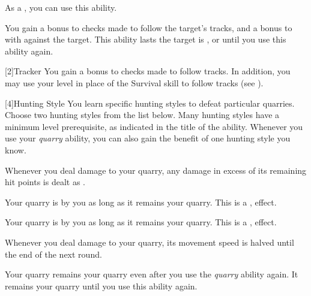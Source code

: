             As a , you can use this ability.
            \begin{ability}
                \begin{spelltargetinginfo}
                \end{spelltargetinginfo}
                \begin{spelleffects}
                    \spelleffect You gain a  bonus to checks made to follow the target's tracks, and a  bonus to  with  against the target.
                    This ability lasts the target is , or until you use this ability again.
                \end{spelleffects}
            \end{ability}

            [2]{Tracker}
            You gain a  bonus to checks made to follow tracks.
            In addition, you may use your level in place of the Survival skill to follow tracks (see ).

            [4]{Hunting Style}
            You learn specific hunting styles to defeat particular quarries.
            Choose two hunting styles from the list below.
            Many hunting styles have a minimum level prerequisite, as indicated in the title of the ability.
            Whenever you use your \textit{quarry} ability, you can also gain the benefit of one hunting style you know.

            Whenever you deal damage to your quarry, any damage in excess of its remaining hit points is dealt as .

            Your quarry is \shaken by you as long as it remains your quarry.
            This is a ,  effect.

            Your quarry is \goaded by you as long as it remains your quarry.
            This is a ,  effect.

            Whenever you deal damage to your quarry, its movement speed is halved until the end of the next round.

            Your quarry remains your quarry even after you use the \textit{quarry} ability again.
            It remains your quarry until you use this ability again.

